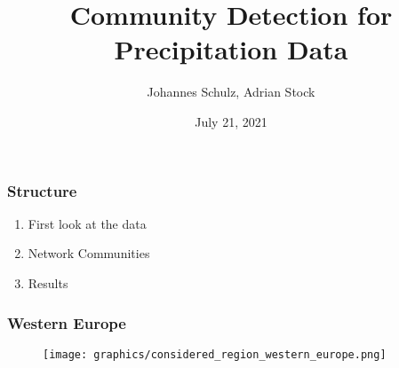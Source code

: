 \documentclass[xcolor=dvipsnames, aspectratio=169]{beamer}
\begin{document}
    
    \title[Community Detection for Precipitation Data]{Community Detection for Precipitation Data}
    \author{Johannes Schulz, Adrian Stock}
    \date{July 21, 2021}

    \begin{frame}
        \titlepage
    \end{frame}

    \begin{frame}
        \frametitle{Structure}
        
        \begin{large}
            \begin{enumerate}
                \item First look at the data
                \item Network Communities
                \begin{itemize}
                \end{itemize}
                \item Results
            \end{enumerate}
        \end{large}
        
    \end{frame}
    
   
    \begin{frame}
        \frametitle{Western Europe}
        \vspace{-.3cm}
        \begin{figure}
            \texttt{[image: graphics/considered\_region\_western\_europe.png]}
        \end{figure}
    \end{frame}
    
\end{document}

